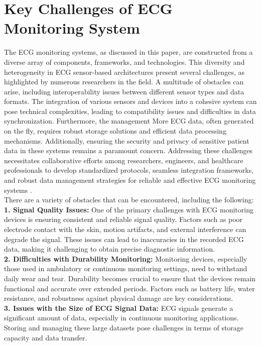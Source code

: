 \section{Key Challenges of ECG Monitoring System}
The ECG monitoring systems, as discussed in this paper, are constructed from a diverse array of components, frameworks, and technologies. This diversity and heterogeneity in ECG sensor-based architectures present several challenges, as highlighted by numerous researchers in the field. A multitude of obstacles can arise, including interoperability issues between different sensor types and data formats. The integration of various sensors and devices into a cohesive system can pose technical complexities, leading to compatibility issues and difficulties in data synchronization. Furthermore, the management More ECG data, often generated on the fly, requires robust storage solutions and efficient data processing mechanisms. Additionally, ensuring the security and privacy of sensitive patient data in these systems remains a paramount concern. Addressing these challenges necessitates collaborative efforts among researchers, engineers, and healthcare professionals to develop standardized protocols, seamless integration frameworks, and robust data management strategies for reliable and effective ECG monitoring systems \cite{serhani2020ecg}.
\\
There are a variety of obstacles that can be encountered, including the following:
\\
\textbf{1. Signal Quality Issues:}
One of the primary challenges with ECG monitoring devices is ensuring consistent and reliable signal quality.
Factors such as poor electrode contact with the skin, motion artifacts, and external interference can degrade the signal.
These issues can lead to inaccuracies in the recorded ECG data, making it challenging to obtain precise diagnostic information.
\\
\textbf{2. Difficulties with Durability Monitoring:}
Monitoring devices, especially those used in ambulatory or continuous monitoring settings, need to withstand daily wear and tear.
Durability becomes crucial to ensure that the devices remain functional and accurate over extended periods.
Factors such as battery life, water resistance, and robustness against physical damage are key considerations.
\\
\textbf{3. Issues with the Size of ECG Signal Data:}
ECG signals generate a significant amount of data, especially in continuous monitoring applications.
Storing and managing these large datasets pose challenges in terms of storage capacity and data transfer.
